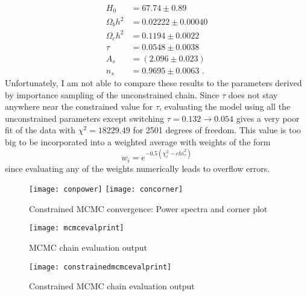 \documentclass{article}
\newcommand{\<}[1]{\left\langle #1 \right\rangle }
\begin{document}
\begin{align*}
	H_0 &= 67.74 \pm 0.89  \\
	\Omega_b h^2 &= 0.02222 \pm 0.00040 \\
	\Omega_c h^2 &= 0.1194 \pm 0.0022 \\
	\tau &= 0.0548 \pm 0.0038 \\
	A_s &=  (2.096 \pm 0.023)\\
	n_s &=  0.9695 \pm 0.0063 \text{ .}
\end{align*}
Unfortunately, I am not able to compare these results to the parameters derived by importance sampling of the unconstrained chain. Since $\tau$ does not stay anywhere near the constrained value for $\tau$, evaluating the model using all the unconstrained parameters except switching $\tau = 0.132 \to 0.054$ gives a very poor fit of the data with $\chi^2 = 18229.49$ for 2501 degrees of freedom. This value is too big to be incorporated into a weighted average with weights of the form 
\[ w_i = e^{-0.5(\chi^2_i - chi^2_\tau)} \]
since evaluating any of the weights numerically leads to overflow errors.

\begin{figure}[h]
	\caption{Constrained MCMC convergence: Power spectra and corner plot}
	\centering
	\texttt{[image: conpower]}
	\texttt{[image: concorner]}
\end{figure}


\begin{figure}[h]
	\caption{MCMC chain evaluation output}
	\centering
	\texttt{[image: mcmcevalprint]}
\end{figure}

\begin{figure}[h]
	\caption{Constrained MCMC chain evaluation output}
	\centering
	\texttt{[image: constrainedmcmcevalprint]}
\end{figure}


	
\end{document}
